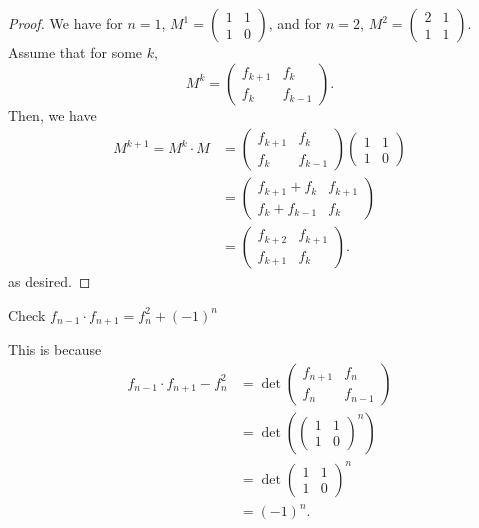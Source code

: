 \begin{proof}
	We have for \( n=1 \), \( M^1 = \begin{pmatrix} 1& 1 \\ 1& 0 \end{pmatrix}  \), and for \( n=2 \), \( M^2=\begin{pmatrix} 2 & 1 \\ 1 & 1 \end{pmatrix}  \). Assume that for some \( k \), \[
		M^k=\begin{pmatrix} f_{k+1} & f_k \\ f_k & f_{k-1} \end{pmatrix} 
	.\] Then, we have 
	\begin{align*}
		M^{k+1} = M^k \cdot M &= \begin{pmatrix}f_{k+1} & f_k \\ f_k & f_{k-1} \end{pmatrix} \begin{pmatrix} 1 & 1 \\ 1 & 0 \end{pmatrix} \\
													&= \begin{pmatrix} f_{k+1}+f_k & f_{k+1} \\ f_k+f_{k-1} & f_k \end{pmatrix} \\
													&= \begin{pmatrix} f_{k+2} & f_{k+1} \\ f_{k+1} & f_k \end{pmatrix} 
	.\end{align*}
	as desired.
\end{proof}

\begin{remark}
	Check \( f_{n-1}\cdot f_{n+1}=f_n^2+(-1)^n \)
\end{remark}

This is because
\begin{align*}
	f_{n-1}\cdot f_{n+1} - f_n^2 &= \det \begin{pmatrix} f_{n+1} & f_n \\ f_n & f_{n-1} \end{pmatrix} \\
															 &= \det \left( \begin{pmatrix} 1 & 1 \\ 1 & 0 \end{pmatrix}^n  \right) \\
																&= \det \begin{pmatrix} 1 & 1 \\ 1 & 0 \end{pmatrix} ^n \\
																&= (-1)^n
.\end{align*}

